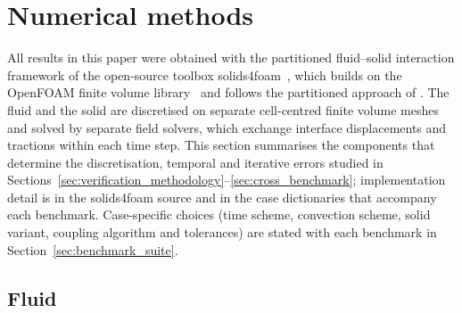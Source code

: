 \section{Numerical methods}\label{sec:numerical_methods}

All results in this paper were obtained with the partitioned fluid--solid interaction framework of the open-source toolbox solids4foam~\citep{Cardiff2025}, which builds on the OpenFOAM finite volume library~\citep{Weller1998} and follows the partitioned approach of \citet{Tukovic2018}.
The fluid and the solid are discretised on separate cell-centred finite volume meshes and solved by separate field solvers, which exchange interface displacements and tractions within each time step.
This section summarises the components that determine the discretisation, temporal and iterative errors studied in Sections~\ref{sec:verification_methodology}--\ref{sec:cross_benchmark}; implementation detail is in the solids4foam source and in the case dictionaries that accompany each benchmark.
Case-specific choices (time scheme, convection scheme, solid variant, coupling algorithm and tolerances) are stated with each benchmark in Section~\ref{sec:benchmark_suite}.

\subsection{Fluid}\label{sec:fluid_solver}

